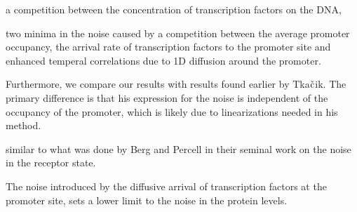 a competition between the concentration of transcription factors on the DNA, 


two minima in the noise caused by a competition between the average promoter occupancy, the arrival rate of transcription factors to the promoter site and enhanced temperal correlations due to 1D diffusion around the promoter. 

Furthermore, we compare our results with results found earlier by Tka$\check{\rm c}$ik. The primary difference is that his expression for the noise is independent of the occupancy of the promoter, which is likely due to linearizations needed in his method.


similar to what was done by Berg and Percell in their seminal work on the noise in the receptor state. 


The noise introduced by the diffusive arrival of transcription factors at the promoter site, sets a lower limit to the noise in the protein levels. 